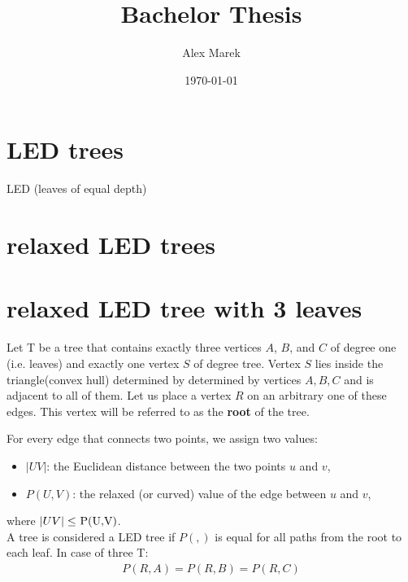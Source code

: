 \documentclass[12pt]{article}
\title{Bachelor Thesis}
\author{Alex Marek}
\date{\today}
\newcommand{\Prize}[2]{P(#1,#2)}
\begin{document}
	
	\maketitle
	
	\section*{LED trees}
	LED (leaves of equal depth)
	
	\maketitle
	
	\section*{relaxed LED trees}
	
	\maketitle
	
	\section*{relaxed LED tree with 3 leaves}
	
	Let T be a tree that contains exactly three vertices \( A \), \( B \), and \( C \) of degree one (i.e. leaves) and exactly one vertex \( S \) of degree tree. Vertex \( S \) lies inside the triangle(convex hull) determined by determined by vertices \( A , B , C \) and is adjacent to all of them. Let us place a vertex \( R \) on an arbitrary one of these edges. This vertex will be referred to as the \textbf{root} of the tree.
	
	For every edge that connects two points, we assign two values:
	\begin{itemize}
	\item \( |UV| \): the Euclidean distance between the two points \( u \) and \( v \),
	\item $\Prize{U}{V}$: the relaxed (or curved) value of the edge between \( u \) and \( v \),
	\end{itemize}
	where \( |UV| \leq  $ \Prize{U}{V}$ \).\\
 	
	A tree is considered a LED tree if $\Prize{}{}$ is equal for all paths from the root to each leaf. In case of three T:
	\begin{align*}
		\Prize{R}{A} = \Prize{R}{B} = \Prize{R}{C}
	\end{align*}
	
\end{document}
